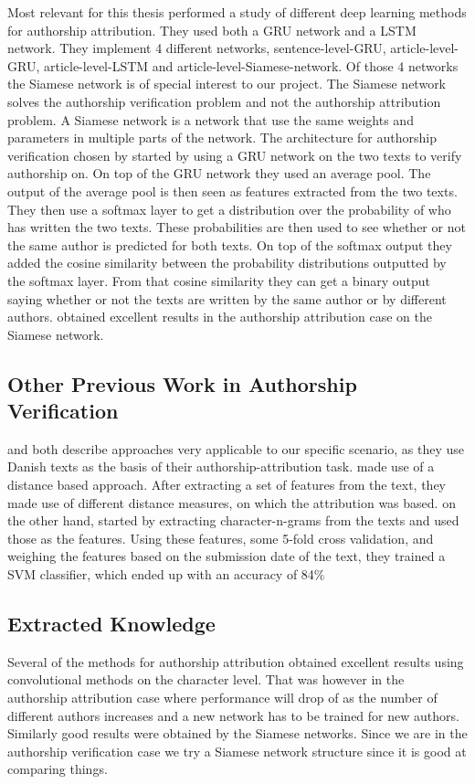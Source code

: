 Most relevant for this thesis \citet{qian:2018} performed a study of different
deep learning methods for authorship attribution. They used both a \gls{GRU}
network and a \gls{LSTM} network. They implement 4 different networks,
sentence-level-\gls{GRU}, article-level-\gls{GRU}, article-level-\gls{LSTM}
and article-level-Siamese-network. Of those 4 networks the Siamese network is
of special interest to our project. The Siamese network solves the authorship
verification problem and not the authorship attribution problem. A Siamese
network is a network that use the same weights and parameters in multiple
parts of the network. The architecture for authorship verification chosen by
\citet{qian:2018} started by using a \gls{GRU} network on the two texts to
verify authorship on. On top of the \gls{GRU} network they used an average
pool. The output of the average pool is then seen as features extracted from
the two texts. They then use a softmax layer to get a distribution over the
probability of who has written the two texts. These probabilities are then used
to see whether or not the same author is predicted for both texts. On top of
the softmax output they added the cosine similarity between the probability
distributions outputted by the softmax layer. From that cosine similarity they
can get a binary output saying whether or not the texts are written by the same
author or by different authors. \citet{qian:2018} obtained excellent results in
the authorship attribution case on the Siamese network.


\subsection{Other Previous Work in Authorship Verification}

\citet{hansen2014} and \citet{aalykke2016} both describe approaches very
applicable to our specific scenario, as they use Danish texts as the basis of
their authorship-attribution task. \citet{aalykke2016} made use of a distance
based approach. After extracting a set of features from the text, they made
use of different distance measures, on which the attribution was based.
\citet{hansen2014} on the other hand, started by extracting character-n-grams
from the texts and used those as the features. Using these features, some 5-fold
cross validation, and weighing the features based on the submission date of the
text, they trained a SVM classifier, which ended up with an accuracy of 84\%

\subsection{Extracted Knowledge}

Several of the methods for authorship attribution obtained excellent results
using convolutional methods on the character level. That was however in the
authorship attribution case where performance will drop of as the number of
different authors increases and a new network has to be trained for new authors.
Similarly good results were obtained by the Siamese networks. Since we are in
the authorship verification case we try a Siamese network structure since it is
good at comparing things. 

